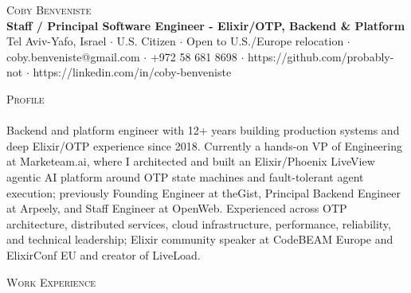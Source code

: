 \documentclass[a4paper]{article}
\newcommand{\lineunder} {
    \vspace*{-8pt} \\
    \hspace*{-18pt} \hrulefill \\
}
\newcommand{\header} [1] {
    {\hspace*{-18pt}\vspace*{6pt} \textsc{#1}}
    \vspace*{-6pt} \lineunder
}
\begin{document}
\vspace*{-40pt}

\vspace*{-10pt}
\begin{center}
	{\Huge \scshape {Coby Benveniste}}\\
	{\large \textbf{Staff / Principal Software Engineer - Elixir/OTP, Backend \& Platform}}\\
	{\small Tel Aviv-Yafo, Israel $\cdot$ U.S. Citizen $\cdot$ Open to U.S./Europe relocation $\cdot$ coby.benveniste@gmail.com $\cdot$ +972 58 681 8698 $\cdot$ https://github.com/probably-not $\cdot$ https://linkedin.com/in/coby-benveniste}\\
\end{center}

\header{Profile}
Backend and platform engineer with 12+ years building production systems and deep Elixir/OTP experience since 2018. Currently a hands-on VP of Engineering at Marketeam.ai, where I architected and built an Elixir/Phoenix LiveView agentic AI platform around OTP state machines and fault-tolerant agent execution; previously Founding Engineer at theGist, Principal Backend Engineer at Arpeely, and Staff Engineer at OpenWeb. Experienced across OTP architecture, distributed services, cloud infrastructure, performance, reliability, and technical leadership; Elixir community speaker at CodeBEAM Europe and ElixirConf EU and creator of LiveLoad.\\
\vspace{1mm}

\header{Work Experience}
\vspace{1mm}
\end{document}
